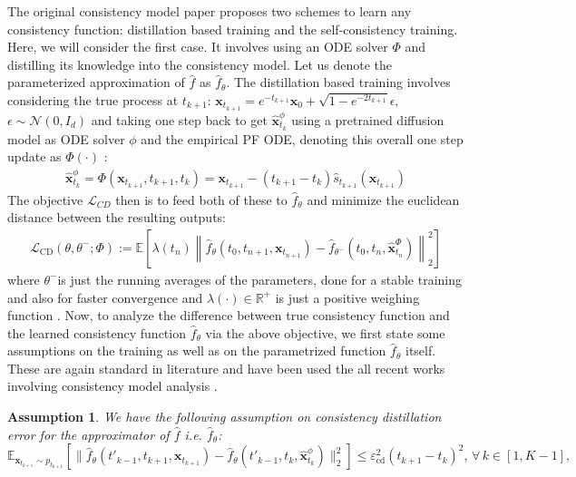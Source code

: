 \documentclass[11pt]{article}
\def\rvx{{\mathbf{x}}}
\def\vx{{\bm{x}}}
\newtheorem{assumption}{Assumption}
\begin{document}
\noindent
The original consistency model paper proposes two schemes to learn any consistency function: distillation based training and the self-consistency training. Here, we will consider the first case. It involves using an ODE solver $\Phi$ and distilling its knowledge into the consistency model. Let us denote the parameterized approximation of $\hat{f}$ as $\hat{f}_\theta$. The distillation based training involves considering the true process at $t_{k+1}$: $\rvx_{t_{k+1}} = e^{-t_{k+1}}\rvx_0 + \sqrt{1-e^{-2t_{k+1}}}\epsilon,$ $\epsilon\sim \mathcal{N}(0,I_d)$ and taking one step back to get $\hat{\vx}^\phi_{t_k}$ using a pretrained diffusion model as ODE solver $\phi$ and the empirical PF ODE, denoting this overall one step update as $\Phi(\cdot)$ : 
\begin{align}
\label{update_x}
\hat{\vx}^\phi_{t_k} = \Phi(\rvx_{t_{k+1}},t_{k+1}, t_k) = \rvx_{t_{k+1}} - ({t_{k+1}-t_k}) \hat{s}_{t_{k+1}}(\rvx_{t_{k+1}})
\end{align}
The objective $\mathcal{L}_{CD}$ then is to feed both of these to $\hat{f}_\theta$ and minimize the euclidean distance between the resulting outputs:
\begin{align}
\label{cd_loss}
\mathcal{L}_{\text{CD}}(\theta, \theta^{-}; \Phi) 
:= \mathbb{E}\left[ \lambda(t_n) \left\| \hat{f}_{\theta}(t_0, t_{n+1}, \rvx_{t_{n+1}}) - \hat{f}_{\theta^{-}}(t_0, t_{n}, \hat{\vx}^{\Phi}_{t_n}) \right\|_2^2 \right]
\end{align}
where $\theta^-$is just the running averages of the parameters, done for a stable training and also for faster convergence and $\lambda(\cdot) \in \mathbb{R}^+$ is just a positive weighing function \cite{song2023consistency}. Now, to analyze the difference between true consistency function and the learned consistency function $\hat{f}_\theta$ via the above objective, we first state some assumptions on the training as well as on the parametrized function $\hat{f}_\theta$ itself. These are again standard in literature and have been used the all recent works involving consistency model analysis \cite{kim2023consistency, song2023consistency, lyu2024sampling}.
\\


\noindent
\begin{assumption}
\label{cd_assumption}
    We have the following assumption \cite{song2023consistency, lyu2024sampling} on consistency distillation error for the approximator of $\hat{f}$ \textit{i.e.} $\hat{f}_\theta$:
\begin{equation}
    \mathbb{E}_{\rvx_{t_{k+1}} \sim p_{t_{k+1}}}\left[\|\hat{f}_\theta(t'_{k-1}, t_{k+1}, \rvx_{t_{k+1}}) - \hat{f}_\theta(t'_{k-1}, t_k, \hat{\vx}^\phi_{t_k})\|_2^2\right] 
    \leq \varepsilon^2_\text{cd}(t_{k+1} - t_k)^2, \, \forall \, k \in [1, K - 1],
\end{equation}
\end{assumption}
\end{document}
